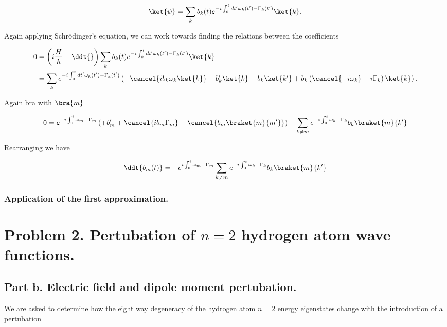 \begin{equation}\label{eqn:qmTwoExamReflection:530}
\ket{\psi}
=
\sum_k b_k(t) e^{-i \int_0^t dt' \omega_k(t') - \Gamma_k(t') } \ket{k}.
\end{equation}

Again applying Schr\"{o}dinger's equation, we can work towards finding the relations between the coefficients

\begin{align*}
0 
&=
\left( i\frac{H}{\hbar} + \ddt{} \right)
\sum_k b_k(t) e^{-i \int_0^t dt' \omega_k(t') - \Gamma_k(t') } \ket{k} 
\\
&=
\sum_k e^{-i \int_0^t dt' \omega_k(t') - \Gamma_k(t') } 
\left(
+ \cancel{i b_k \omega_k \ket{k} }
+ b_k' \ket{k} 
+ b_k \ket{k'} 
+ b_k \left( \cancel{-i \omega_k} +i \Gamma_k \right) \ket{k} 
\right).
\end{align*}

Again bra with $\bra{m}$

\begin{align*}
0 
=
e^{-i \int_0^t  \omega_m - \Gamma_m } 
\left(
+ b_m' 
+ \cancel{i b_m \Gamma_m }
+ \cancel{b_m \braket{m}{m'} }
\right)
+\sum_{k\ne m} e^{-i \int_0^t  \omega_k - \Gamma_k } b_k \braket{m}{k'} 
\end{align*}

Rearranging we have

\begin{equation}\label{eqn:qmTwoExamReflection:550}
\ddt{b_m(t)} = 
-
e^{i \int_0^t  \omega_m - \Gamma_m } 
\sum_{k\ne m} e^{-i \int_0^t \omega_k - \Gamma_k } b_k \braket{m}{k'} 
\end{equation}

\subsubsection{Application of the first approximation.}

\section{Problem 2.  Pertubation of $n=2$ hydrogen atom wave functions.}

\subsection{Part b.  Electric field and dipole moment pertubation.}

We are asked to determine how the eight way degeneracy of the hydrogen atom $n=2$ energy eigenstates change with the introduction of a pertubation

